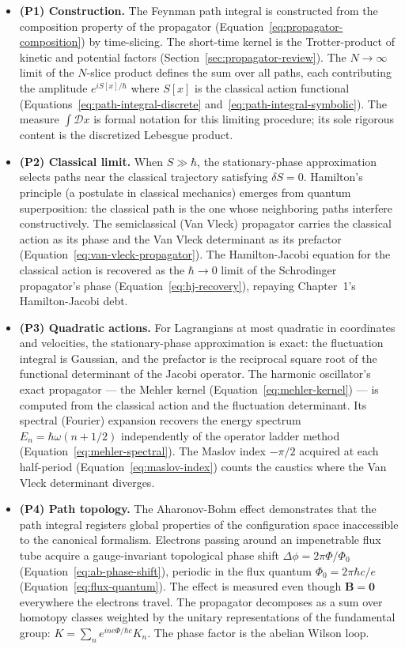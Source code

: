 \begin{itemize}
\item \textbf{(P1) Construction.} The Feynman path integral is constructed from the composition property of the propagator (Equation~\eqref{eq:propagator-composition}) by time-slicing. The short-time kernel is the Trotter-product of kinetic and potential factors (Section~\ref{sec:propagator-review}). The $N \to \infty$ limit of the $N$-slice product defines the sum over all paths, each contributing the amplitude $e^{iS[x]/\hbar}$ where $S[x]$ is the classical action functional (Equations~\eqref{eq:path-integral-discrete} and~\eqref{eq:path-integral-symbolic}). The measure $\int\mathcal{D}x$ is formal notation for this limiting procedure; its sole rigorous content is the discretized Lebesgue product.

\item \textbf{(P2) Classical limit.} When $S \gg \hbar$, the stationary-phase approximation selects paths near the classical trajectory satisfying $\delta S = 0$. Hamilton's principle (a postulate in classical mechanics) emerges from quantum superposition: the classical path is the one whose neighboring paths interfere constructively. The semiclassical (Van Vleck) propagator carries the classical action as its phase and the Van Vleck determinant as its prefactor (Equation~\eqref{eq:van-vleck-propagator}). The Hamilton-Jacobi equation for the classical action is recovered as the $\hbar \to 0$ limit of the Schrodinger propagator's phase (Equation~\eqref{eq:hj-recovery}), repaying Chapter~1's Hamilton-Jacobi debt.

\item \textbf{(P3) Quadratic actions.} For Lagrangians at most quadratic in coordinates and velocities, the stationary-phase approximation is exact: the fluctuation integral is Gaussian, and the prefactor is the reciprocal square root of the functional determinant of the Jacobi operator. The harmonic oscillator's exact propagator --- the Mehler kernel (Equation~\eqref{eq:mehler-kernel}) --- is computed from the classical action and the fluctuation determinant. Its spectral (Fourier) expansion recovers the energy spectrum $E_n = \hbar\omega(n+1/2)$ independently of the operator ladder method (Equation~\eqref{eq:mehler-spectral}). The Maslov index $-\pi/2$ acquired at each half-period (Equation~\eqref{eq:maslov-index}) counts the caustics where the Van Vleck determinant diverges.

\item \textbf{(P4) Path topology.} The Aharonov-Bohm effect demonstrates that the path integral registers global properties of the configuration space inaccessible to the canonical formalism. Electrons passing around an impenetrable flux tube acquire a gauge-invariant topological phase shift $\Delta\phi = 2\pi\Phi/\Phi_0$ (Equation~\eqref{eq:ab-phase-shift}), periodic in the flux quantum $\Phi_0 = 2\pi\hbar c/e$ (Equation~\eqref{eq:flux-quantum}). The effect is measured even though $\bm B = \bm 0$ everywhere the electrons travel. The propagator decomposes as a sum over homotopy classes weighted by the unitary representations of the fundamental group: $K = \sum_n e^{in e\Phi/\hbar c} K_n$. The phase factor is the abelian Wilson loop.


\end{itemize}
